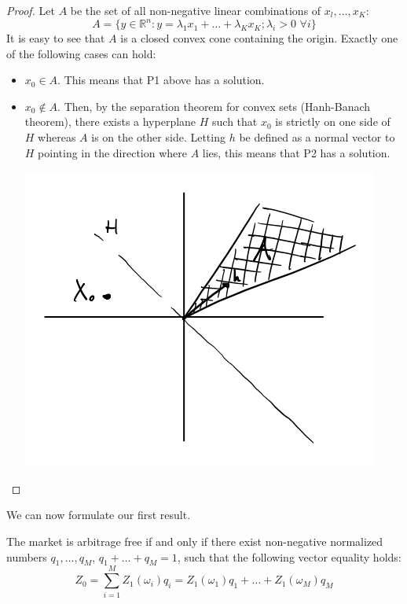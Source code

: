 \begin{proof}
    Let $A$ be the set of all non-negative linear combinations of $x_l,...,x_K$:
    $$A=\{y\in\mathbb{R}^n:y=\lambda_1x_1+\dots+\lambda_Kx_K; \lambda_i>0\,\,\forall i\}$$
    It is easy to see that $A$ is a closed convex cone containing the origin. Exactly one of the following cases can hold: 
    \begin{itemize}
    \item $x_0\in A$. This means that P1 above has a solution.
    \item $x_0\notin A$. Then, by the separation theorem for convex sets (Hanh-Banach theorem), there exists a hyperplane $H$ such that $x_0$ is strictly on one side of $H$ whereas $A$ is on the other side. Letting $h$ be defined as a normal vector to $H$ pointing in the direction where $A$ lies, this means that P2 has a solution.
    \begin{center}
        \includegraphics[scale=0.2]{fig/tmp/fig8}
    \end{center}
    \end{itemize}
\end{proof}
We can now formulate our first result.
\begin{theorem}\label{arbfreeth}
    The market is arbitrage free if and only if there exist non-negative normalized numbers $q_1,\dots,q_M$, $q_1+\dots+q_M=1$, such that the following vector equality holds:
    \begin{equation}\label{Z0}
        Z_0 = \sum^M_{i=1} Z_1(\omega_i)q_i = Z_1(\omega_1)q_1 + \dots + Z_1(\omega_M)q_M
    \end{equation}
\end{theorem}
